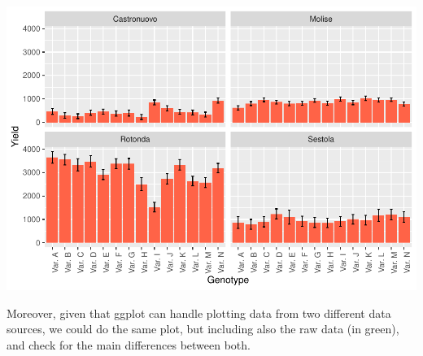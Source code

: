 \documentclass[
]{book}
\begin{document}
\includegraphics{PPB-Toolkit-for-R-and-R-Studio_files/figure-latex/myplotafterloop-1.pdf}

Moreover, given that ggplot can handle plotting data from two different data sources, we could do the same plot, but including also the raw data (in green), and check for the main differences between both.
\end{document}
